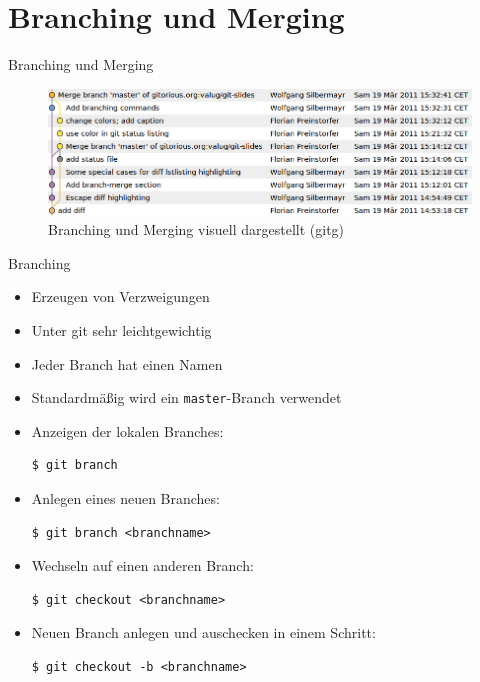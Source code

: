 \section{Branching und Merging}

\begin{frame}
  \tableofcontents[currentsection]
\end{frame}

\begin{frame}{Branching und Merging}
  \begin{figure}
    \includegraphics[width=1\textwidth]{img/branch-merge}
    \caption[format=empty]{Branching und Merging visuell dargestellt (gitg)}
  \end{figure}
\end{frame}

\begin{frame}{Branching}
  \begin{itemize}
    \item Erzeugen von Verzweigungen
    \item Unter git sehr leichtgewichtig
    \item Jeder Branch hat einen Namen
    \item Standardmäßig wird ein \texttt{master}-Branch verwendet
    \framebreak

    \item Anzeigen der lokalen Branches:
    \begin{lstlisting}
$ git branch
    \end{lstlisting}
    \item Anlegen eines neuen Branches:
    \begin{lstlisting}
$ git branch <branchname>
    \end{lstlisting}
    \item Wechseln auf einen anderen Branch:
    \begin{lstlisting}
$ git checkout <branchname>
    \end{lstlisting}
    \item Neuen Branch anlegen und auschecken in einem Schritt:
    \begin{lstlisting}
$ git checkout -b <branchname>
    \end{lstlisting}

  \end{itemize}

\end{frame}

